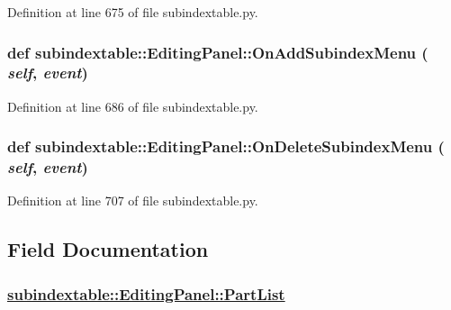 Definition at line 675 of file subindextable.py.\hypertarget{classsubindextable_1_1EditingPanel_6545422508739a2dd81fdc1d39ef83d5}{
\subsubsection[OnAddSubindexMenu]{\setlength{\rightskip}{0pt plus 5cm}def subindextable::Editing\-Panel::On\-Add\-Subindex\-Menu ( {\em self},  {\em event})}}
\label{classsubindextable_1_1EditingPanel_6545422508739a2dd81fdc1d39ef83d5}




Definition at line 686 of file subindextable.py.\hypertarget{classsubindextable_1_1EditingPanel_fc1d34c2558da246e0574482344374d5}{
\subsubsection[OnDeleteSubindexMenu]{\setlength{\rightskip}{0pt plus 5cm}def subindextable::Editing\-Panel::On\-Delete\-Subindex\-Menu ( {\em self},  {\em event})}}
\label{classsubindextable_1_1EditingPanel_fc1d34c2558da246e0574482344374d5}




Definition at line 707 of file subindextable.py.

\subsection{Field Documentation}
\hypertarget{classsubindextable_1_1EditingPanel_98690bae225b493e39e38389177af70b}{
\subsubsection[PartList]{\setlength{\rightskip}{0pt plus 5cm}\hyperlink{classsubindextable_1_1EditingPanel_98690bae225b493e39e38389177af70b}{subindextable::Editing\-Panel::Part\-List}}}
\label{classsubindextable_1_1EditingPanel_98690bae225b493e39e38389177af70b}




